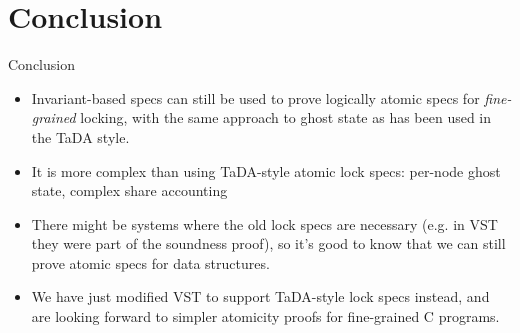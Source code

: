 \documentclass[professionalfonts, xcolor=table]{beamer}
\begin{document}
\section{Conclusion}
\begin{frame}{Conclusion}
  \begin{itemize}[<+->]
  \item Invariant-based specs can still be used to prove logically
    atomic specs for \emph{fine-grained} locking, with the same
    approach to ghost state as has been used in the TaDA style.
  \item It is more complex than using TaDA-style atomic lock specs: per-node ghost state, complex share accounting
  \item There might be systems where the old lock specs are necessary
    (e.g. in VST they were part of the soundness proof), so it’s good
    to know that we can still prove atomic specs for data structures.
  \item We have just modified VST to support TaDA-style lock specs
    instead, and are looking forward to simpler atomicity proofs for
    fine-grained C programs.
  \end{itemize}
\end{frame}
\end{document}
